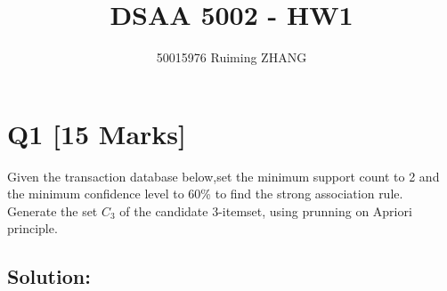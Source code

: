 \documentclass[en,black,normal,10pt]{elegantnote}
\title{DSAA 5002 - HW1}
\author{50015976 Ruiming ZHANG}
\date{}
\begin{document}
\maketitle

\section*{Q1 [15 Marks]}

Given the transaction database below,set the minimum support count to 2 and the minimum confidence level to 60\% to find the strong association rule.
Generate the set $C_3$ of the candidate 3-itemset, using prunning on Apriori principle.


\subsection*{Solution:}
\end{document}
